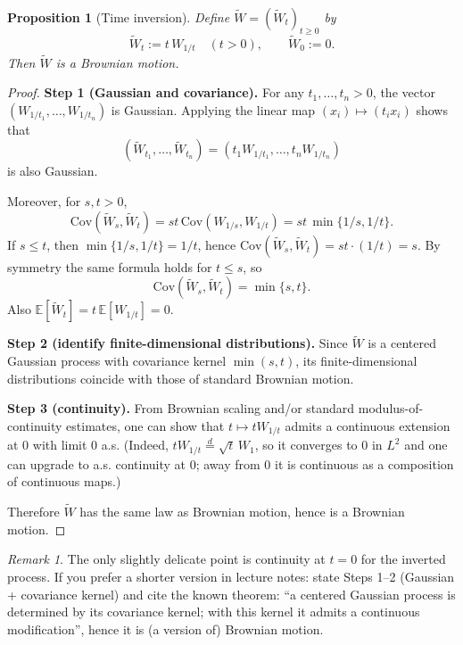 \documentclass[11pt]{article}
\newtheorem{proposition}[theorem]{Proposition}
\theoremstyle{definition}
\theoremstyle{remark}
\newtheorem{remark}[theorem]{Remark}
\newcommand{\E}{\mathbb{E}}
\newcommand{\Cov}{\mathrm{Cov}}
\begin{document}
\begin{proposition}[Time inversion]
Define $\widetilde W=(\widetilde W_t)_{t\ge0}$ by
\[
\widetilde W_t:= t\,W_{1/t}\quad (t>0),\qquad \widetilde W_0:=0.
\]
Then $\widetilde W$ is a Brownian motion.
\end{proposition}

\begin{proof}
\textbf{Step 1 (Gaussian and covariance).}
For any $t_1,\dots,t_n>0$, the vector $(W_{1/t_1},\dots,W_{1/t_n})$ is Gaussian.
Applying the linear map $(x_i)\mapsto (t_i x_i)$ shows that
\[
(\widetilde W_{t_1},\dots,\widetilde W_{t_n})
=(t_1 W_{1/t_1},\dots,t_n W_{1/t_n})
\]
is also Gaussian.

Moreover, for $s,t>0$,
\[
\Cov(\widetilde W_s,\widetilde W_t)
= st\,\Cov(W_{1/s},W_{1/t})
= st\,\min\{1/s,1/t\}.
\]
If $s\le t$, then $\min\{1/s,1/t\}=1/t$, hence $\Cov(\widetilde W_s,\widetilde W_t)=st\cdot (1/t)=s$.
By symmetry the same formula holds for $t\le s$, so
\[
\Cov(\widetilde W_s,\widetilde W_t)=\min\{s,t\}.
\]
Also $\E[\widetilde W_t]=t\,\E[W_{1/t}]=0$.

\medskip
\textbf{Step 2 (identify finite-dimensional distributions).}
Since $\widetilde W$ is a centered Gaussian process with covariance kernel $\min(s,t)$,
its finite-dimensional distributions coincide with those of standard Brownian motion.

\medskip
\textbf{Step 3 (continuity).}
From Brownian scaling and/or standard modulus-of-continuity estimates, one can show that
$t\mapsto tW_{1/t}$ admits a continuous extension at $0$ with limit $0$ a.s.
(Indeed, $tW_{1/t}\stackrel{d}{=}\sqrt{t}\,W_1$, so it converges to $0$ in $L^2$ and one can upgrade to a.s.
continuity at $0$; away from $0$ it is continuous as a composition of continuous maps.)

\medskip
Therefore $\widetilde W$ has the same law as Brownian motion, hence is a Brownian motion.
\end{proof}

\begin{remark}
The only slightly delicate point is continuity at $t=0$ for the inverted process.
If you prefer a shorter version in lecture notes: state Steps 1--2 (Gaussian + covariance kernel)
and cite the known theorem: ``a centered Gaussian process is determined by its covariance kernel; with this kernel
it admits a continuous modification'', hence it is (a version of) Brownian motion.
\end{remark}
\end{document}
